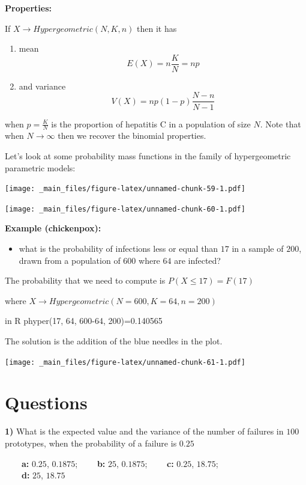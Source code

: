 \documentclass[
]{book}
\providecommand{\tightlist}{%
  \setlength{\itemsep}{0pt}\setlength{\parskip}{0pt}}
\begin{document}
\textbf{Properties:}

If \(X \rightarrow Hypergeometric(N,K,n)\) then it has

\begin{enumerate}
\def\labelenumi{\arabic{enumi})}
\item
  mean \[E(X) =  n  \frac{K}{N} = np\]
\item
  and variance \[V(X) = np(1-p)\frac{N-n}{N-1}\]
\end{enumerate}

when \(p=\frac{K}{N}\) is the proportion of hepatitis C in a population of size \(N\). Note that when \(N \rightarrow \infty\) then we recover the binomial properties.

Let's look at some probability mass functions in the family of hypergeometric parametric models:

\texttt{[image: \_main\_files/figure-latex/unnamed-chunk-59-1.pdf]}

\texttt{[image: \_main\_files/figure-latex/unnamed-chunk-60-1.pdf]}

\textbf{Example (chickenpox):}

\begin{itemize}
\tightlist
\item
  what is the probability of infections less or equal than \(17\) in a sample of \(200\), drawn from a population of \(600\) where \(64\) are infected?
\end{itemize}

The probability that we need to compute is
\(P(X \leq 17)=F(17)\)

where \(X \rightarrow Hypergeometric(N=600,K=64,n=200)\)

in R phyper(17, 64, 600-64, 200)=0.140565

The solution is the addition of the blue needles in the plot.

\texttt{[image: \_main\_files/figure-latex/unnamed-chunk-61-1.pdf]}

\hypertarget{questions-4}{%
\section{Questions}\label{questions-4}}

\textbf{1)} What is the expected value and the variance of the number of failures in \(100\) prototypes, when the probability of a failure is \(0.25\)

\textbf{\(\qquad\)a:} \(0.25\), \(0.1875\);
\textbf{\(\qquad\)b:} \(25\), \(0.1875\);
\textbf{\(\qquad\)c:} \(0.25\), \(18.75\);\\
\textbf{\(\qquad\)d:} \(25\), \(18.75\)
\end{document}
